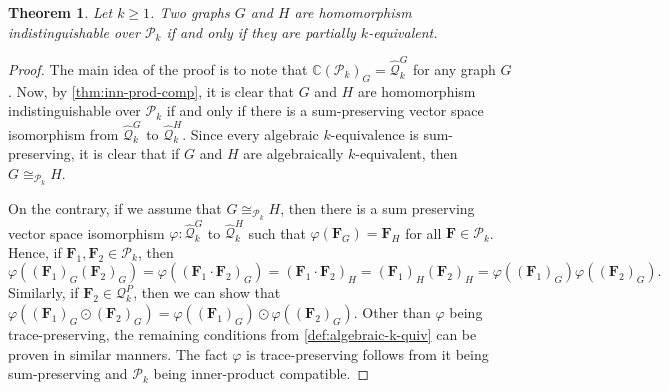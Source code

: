 \documentclass[a4paper,onecolumn,11pt,accepted=2026-01-06]{quantumarticle}
\theoremstyle{plain}
\newtheorem{thm}{Theorem}[section]
\theoremstyle{remark}
\theoremstyle{definition}
\def\calP{{\mathcal P}} \def\calQ{{\mathcal Q}} \def\calR{{\mathcal R}}
\begin{document}
\begin{thm}\label{thm:main-theorem-3}
  Let $k\geq 1$. 
  Two graphs $G$ and $H$ are homomorphism indistinguishable over $\calP_k$ if and only if they are partially $k$-equivalent.
\end{thm}
\begin{proof}
The main idea of the proof is to note that $\mathbb{C}(\calP_k)_G = \hat{\calQ}_k^G$ for any graph $G$. Now, by \cref{thm:inn-prod-comp}, it is clear that $G$ and $H$ are homomorphism indistinguishable over $\calP_k$ if and only if there is a sum-preserving vector space isomorphism from $ \hat{\calQ}_k^G$ to $ \hat{\calQ}_k^H$. Since every algebraic $k$-equivalence is sum-preserving, it is clear that if $G$ and $H$ are algebraically $k$-equivalent, then $G \cong_{\calP_k} H$. 

On the contrary, if we assume that $G \cong_{\calP_k} H$, then there is a sum preserving vector space isomorphism $\varphi\colon \hat{\calQ}_k^G$ to $ \hat{\calQ}_k^H$ such that $\varphi(\boldsymbol{F}_G) = \boldsymbol{F}_H$ for all $\boldsymbol{F} \in \calP_k$. Hence, if $\boldsymbol{F}_1, \boldsymbol{F}_2 \in \calP_k$, then
\[\varphi((\boldsymbol{F}_1)_G(\boldsymbol{F}_2)_G) = \varphi((\boldsymbol{F}_1 \cdot \boldsymbol{F}_2)_G) = (\boldsymbol{F}_1 \cdot \boldsymbol{F}_2)_H = (\boldsymbol{F}_1)_H(\boldsymbol{F}_2)_H = \varphi((\boldsymbol{F}_1)_G) \varphi((\boldsymbol{F}_2)_G).\]
Similarly, if $\boldsymbol{F}_2 \in \calQ_k^P$, then we can show that $\varphi((\boldsymbol{F}_1)_G \odot (\boldsymbol{F}_2)_G) = \varphi((\boldsymbol{F}_1)_G) \odot \varphi((\boldsymbol{F}_2)_G)$. Other than $\varphi$ being trace-preserving, the remaining conditions from \cref{def:algebraic-k-quiv} can be proven in similar manners. The fact $\varphi$ is trace-preserving follows from it being sum-preserving and $\calP_k$ being inner-product compatible.

\end{proof}
\end{document}
